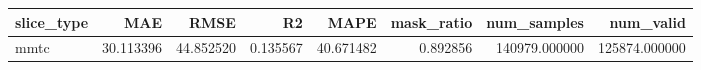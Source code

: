 \begin{tabular}{lrrrrrrr}
\toprule
slice_type & MAE & RMSE & R2 & MAPE & mask_ratio & num_samples & num_valid \\
\midrule
mmtc & 30.113396 & 44.852520 & 0.135567 & 40.671482 & 0.892856 & 140979.000000 & 125874.000000 \\
\bottomrule
\end{tabular}
